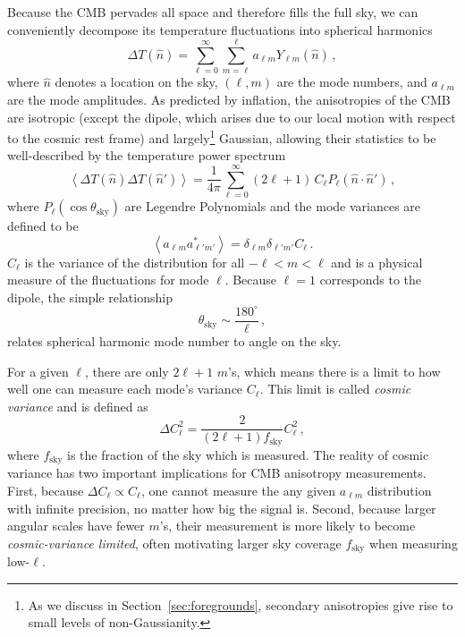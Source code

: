 Because the CMB pervades all space and therefore fills the full sky, we can conveniently decompose its temperature fluctuations into spherical harmonics
\begin{equation}
    \Delta T(\hat{n}) = \sum_{\ell = 0}^{\infty} \sum_{m = \ell}^{\ell} a_{\ell m} Y_{\ell m}(\hat{n}) \, ,
    \label{eq:spherical_harmonics}
\end{equation}
where $\hat{n}$ denotes a location on the sky, $(\ell, m)$ are the mode numbers, and $a_{\ell m}$ are the mode amplitudes. As predicted by inflation, the anisotropies of the CMB are isotropic (except the dipole, which arises due to our local motion with respect to the cosmic rest frame) and largely\footnote{As we discuss in Section~\ref{sec:foregrounds}, secondary anisotropies give rise to small levels of non-Gaussianity.} Gaussian, allowing their statistics to be well-described by the temperature power spectrum
\begin{equation}
    \left< \Delta T(\hat{n}) \Delta T(\hat{n}') \right> = \frac{1}{4 \pi} \sum_{\ell = 0}^{\infty} (2 \ell + 1) \, C_{\ell} P_{\ell}(\hat{n} \cdot \hat{n}') \, ,
    \label{eq:temperature_power_spectrum}
\end{equation}
where $P_{\ell}(\cos \theta_{\mathrm{sky}})$ are Legendre Polynomials and the mode variances are defined to be
\begin{equation}
    \left< a_{\ell m} a^{*}_{\ell' m'} \right> = \delta_{\ell m} \delta_{\ell' m'} C_{\ell} \, .
    \label{eq:C_ell}
\end{equation}
$C_{\ell}$ is the variance of the distribution for all $-\ell < m < \ell$ and is a physical measure of the fluctuations for mode $\ell$. Because $\ell = 1$ corresponds to the dipole, the simple relationship 
\begin{equation}
    \theta_{\mathrm{sky}} \sim \frac{180^{\circ}}{\ell} \, ,
    \label{eq:ell_theta_relation}
\end{equation}
relates spherical harmonic mode number to angle on the sky.

For a given $\ell$, there are only $2 \ell + 1$ $m$'s, which means there is a limit to how well one can measure each mode's variance $C_{\ell}$. This limit is called \textit{cosmic variance} and is defined as
\begin{equation}
    \Delta C_{\ell}^{2} = \frac{2}{(2 \ell + 1) f_{\mathrm{sky}}} C_{\ell}^{2} \, ,
    \label{eq:cosmic_variance}
\end{equation}
where $f_{\mathrm{sky}}$ is the fraction of the sky which is measured. The reality of cosmic variance has two important implications for CMB anisotropy measurements. First, because $\Delta C_{\ell} \propto C_{\ell}$, one cannot measure the any given $a_{\ell m}$ distribution with infinite precision, no matter how big the signal is. Second, because larger angular scales have fewer $m$'s, their measurement is more likely to become \textit{cosmic-variance limited}, often motivating larger sky coverage $f_{\mathrm{sky}}$ when measuring low-$\ell$.

